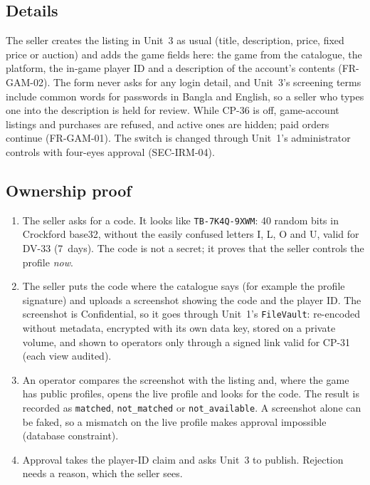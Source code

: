 \documentclass[11pt,a4paper]{article}
\begin{document}
\subsection{Details}
The seller creates the listing in Unit~3 as usual (title, description, price, fixed price or auction) and adds the game fields here: the game from the catalogue, the platform, the in-game player ID and a description of the account's contents (FR-GAM-02). The form never asks for any login detail, and Unit~3's screening terms include common words for passwords in Bangla and English, so a seller who types one into the description is held for review. While CP-36 is off, game-account listings and purchases are refused, and active ones are hidden; paid orders continue (FR-GAM-01). The switch is changed through Unit~1's administrator controls with four-eyes approval (SEC-IRM-04).

\subsection{Ownership proof}
\label{sec:review}
\begin{enumerate}[nosep]
  \item The seller asks for a code. It looks like \texttt{TB-7K4Q-9XWM}: 40 random bits in Crockford base32, without the easily confused letters I, L, O and U, valid for DV-33 (7~days). The code is not a secret; it proves that the seller controls the profile \emph{now}.
  \item The seller puts the code where the catalogue says (for example the profile signature) and uploads a screenshot showing the code and the player ID. The screenshot is Confidential, so it goes through Unit~1's \texttt{FileVault}: re-encoded without metadata, encrypted with its own data key, stored on a private volume, and shown to operators only through a signed link valid for CP-31 (each view audited).
  \item An operator compares the screenshot with the listing and, where the game has public profiles, opens the live profile and looks for the code. The result is recorded as \texttt{matched}, \texttt{not\_matched} or \texttt{not\_available}. A screenshot alone can be faked, so a mismatch on the live profile makes approval impossible (database constraint).
  \item Approval takes the player-ID claim and asks Unit~3 to publish. Rejection needs a reason, which the seller sees.
\end{enumerate}
\end{document}
